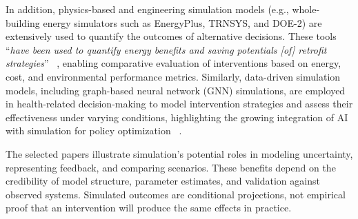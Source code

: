 \documentclass{sfuthesis}
\begin{document}
In addition, physics-based and engineering simulation models (e.g., whole-building energy simulators such as EnergyPlus, TRNSYS, and DOE-2) are extensively used to quantify the outcomes of alternative decisions. These tools “\textit{have been used to quantify energy benefits and saving potentials [of] retrofit strategies}” ~\cite{cecconi2022data}, enabling comparative evaluation of interventions based on energy, cost, and environmental performance metrics. Similarly, data-driven simulation models, including graph-based neural network (GNN) simulations, are employed in health-related decision-making to model intervention strategies and assess their effectiveness under varying conditions, highlighting the growing integration of AI with simulation for policy optimization ~\cite{li2024optimal}.\par
The selected papers illustrate simulation's potential roles in modeling uncertainty, representing feedback, and comparing scenarios. These benefits depend on the credibility of model structure, parameter estimates, and validation against observed systems. Simulated outcomes are conditional projections, not empirical proof that an intervention will produce the same effects in practice.
\end{document}
